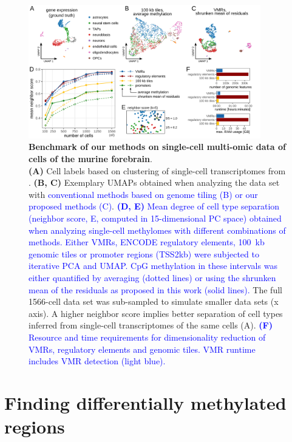 \documentclass[twocolumn,10pt]{article}
\newcommand{\new}[1]{\textcolor{blue}{#1}}
\begin{document}
\begin{figure}
	\begin{center}
		\includegraphics[width=0.9\textwidth]{figures/Fig_benchmark.png}
	\end{center}
	\caption{\small \textbf{Benchmark of our methods on single-cell multi-omic data of cells of the murine forebrain}.\\
		\textbf{(A)} Cell labels based on clustering of single-cell transcriptomes from \citet{kremer_scnmt}.
		\textbf{(B, C)} Exemplary UMAPs obtained when analyzing the data set with \new{conventional methods based on genome tiling (B) or our proposed methods (C)}.
		\new{
		\textbf{(D, E)} Mean degree of cell type separation (neighbor score, E, computed in 15-dimensional PC space) obtained when analyzing single-cell methylomes with different combinations of methods.
		Either VMRs, ENCODE regulatory elements, 100~kb genomic tiles or promoter regions (TSS\textpm2kb) were subjected to iterative PCA and UMAP.
		CpG methylation in these intervals was either quantified by averaging (dotted lines) or using the shrunken mean of the residuals as proposed in this work (solid lines).
	    }
		The full 1566-cell data set was sub-sampled to simulate smaller data sets (x axis).
		A higher neighbor score implies better separation of cell types inferred from single-cell transcriptomes of the same cells (A).
		\new{
		\textbf{(F)} Resource and time requirements for dimensionality reduction of VMRs, regulatory elements and genomic tiles.
		VMR runtime includes VMR detection (light blue).
		}
	}
	\label{fig:score}
\end{figure}


\section{Finding differentially methylated regions}
\end{document}
